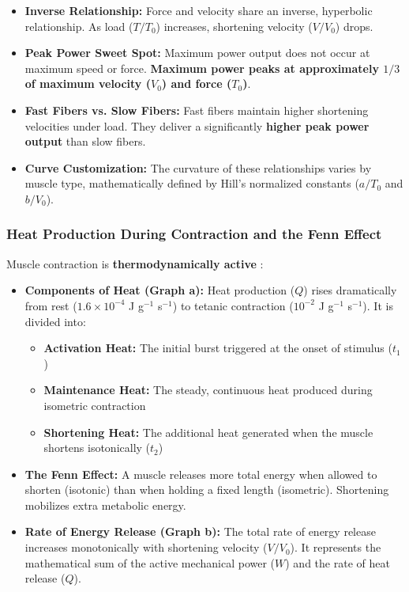 \documentclass{article}
\begin{document}
\begin{itemize}
    \item \textbf{Inverse Relationship:} Force and velocity share an inverse, hyperbolic relationship. As load ($T/T_0$) increases, shortening velocity ($V/V_0$) drops.
    \item \textbf{Peak Power Sweet Spot:} Maximum power output does not occur at maximum speed or force. \textbf{Maximum power peaks at approximately $1/3$ of maximum velocity ($V_0$) and force ($T_0$)}.
    \item \textbf{Fast Fibers vs. Slow Fibers:} Fast fibers maintain higher shortening velocities under load. They deliver a significantly \textbf{higher peak power output} than slow fibers.
    \item \textbf{Curve Customization:} The curvature of these relationships varies by muscle type, mathematically defined by Hill's normalized constants ($a/T_0$ and $b/V_0$).
\end{itemize}

\subsubsection{Heat Production During Contraction and the Fenn Effect}
Muscle contraction is \textbf{thermodynamically active} :

\begin{itemize}
    \item \textbf{Components of Heat (Graph a):} Heat production ($Q$) rises dramatically from rest ($1.6 \times 10^{-4}$ J g$^{-1}$ s$^{-1}$) to tetanic contraction ($10^{-2}$ J g$^{-1}$ s$^{-1}$). It is divided into:
    \begin{itemize}
        \item \textbf{Activation Heat:} The initial burst triggered at the onset of stimulus ($t_1$)
        \item \textbf{Maintenance Heat:} The steady, continuous heat produced during isometric contraction
        \item \textbf{Shortening Heat:} The additional heat generated when the muscle shortens isotonically ($t_2$)
    \end{itemize}
    \item \textbf{The Fenn Effect:} A muscle releases more total energy when allowed to shorten (isotonic) than when holding a fixed length (isometric). Shortening mobilizes extra metabolic energy.
    \item \textbf{Rate of Energy Release (Graph b):} The total rate of energy release increases monotonically with shortening velocity ($V/V_0$). It represents the mathematical sum of the active mechanical power ($W$) and the rate of heat release ($Q$).
\end{itemize}
\end{document}
